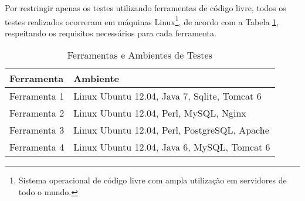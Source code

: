 Por restringir apenas os testes utilizando ferramentas de código livre, todos os testes realizados ocorreram em máquinas Linux\footnote{Sistema operacional de código livre com ampla utilização em servidores de todo o mundo.}, de acordo com a Tabela \ref{tab:lista-servidores}, respeitando os requisitos necessários para cada ferramenta.

\begin{table}
    \caption{Ferramentas e Ambientes de Testes}
    \begin{center}
    	\begin{tabular}{|p{3cm}|p{8cm}|}
			\hline \textbf{Ferramenta} & \textbf{Ambiente}\\ 
			\hline Ferramenta 1 & Linux Ubuntu 12.04, Java 7, Sqlite, Tomcat 6 \\
			\hline Ferramenta 2 & Linux Ubuntu 12.04, Perl, MySQL, Nginx \\
			\hline Ferramenta 3 & Linux Ubuntu 12.04, Perl, PostgreSQL, Apache \\
			\hline Ferramenta 4 & Linux Ubuntu 12.04, Java 6, MySQL, Tomcat 6 \\
	    	\hline 
    	\end{tabular} 
    \end{center}
  	\label{tab:lista-servidores}
\end{table}